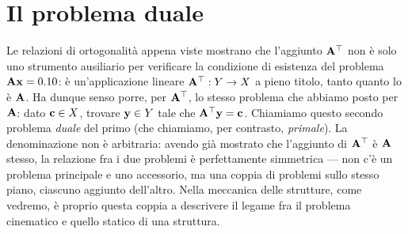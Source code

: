 %
%	

	\section{Il problema duale}
	
	Le relazioni di ortogonalità appena viste mostrano che l'aggiunto $\mathbf{A}^\top$ non è solo uno strumento ausiliario per verificare la condizione di esistenza del problema $\mathbf{A}\mathbf{x}=0.10$: è un'applicazione lineare $\mathbf{A}^\top:Y\to X$ a pieno titolo, tanto quanto lo è $\mathbf{A}$. Ha dunque senso porre, per $\mathbf{A}^\top$, lo stesso problema che abbiamo posto per $\mathbf{A}$: dato $\mathbf{c}\in X$, trovare $\mathbf{y}\in Y$ tale che $\mathbf{A}^\top\mathbf{y}=\mathbf{c}$. Chiamiamo questo secondo problema \textit{duale} del primo (che chiamiamo, per contrasto, \textit{primale}). La denominazione non è arbitraria: avendo già mostrato che l'aggiunto di $\mathbf{A}^\top$ è $\mathbf{A}$ stesso, la relazione fra i due problemi è perfettamente simmetrica --- non c'è un problema principale e uno accessorio, ma una coppia di problemi sullo stesso piano, ciascuno aggiunto dell'altro. Nella meccanica delle strutture, come vedremo, è proprio questa coppia a descrivere il legame fra il problema cinematico e quello statico di una struttura.

